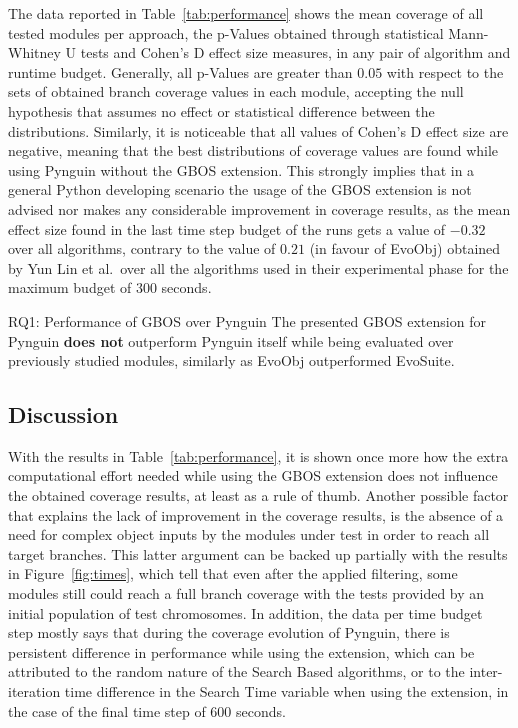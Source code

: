 \documentclass[%
  chapterprefix=false,%
  open=right,%
  twoside=true,%
  paper=a4,%
  logofile={Figures/logo.png},%
  thesistype=master,%
  UKenglish,%
]{se2thesis}
\begin{document}
The data reported in Table~\ref{tab:performance} shows the mean coverage of all tested modules per approach, the p-Values obtained through statistical Mann-Whitney U tests and Cohen's D effect size measures, in any pair of algorithm and runtime budget.
Generally, all p-Values are greater than \(0.05\) with respect to the sets of obtained branch coverage values in each module, accepting the null hypothesis that assumes no effect or statistical difference between the distributions.
Similarly, it is noticeable that all values of Cohen's D effect size are negative, meaning that the best distributions of coverage values are found while using Pynguin without the GBOS extension.
This strongly implies that in a general Python developing scenario the usage of the GBOS extension is not advised nor makes any considerable improvement in coverage results, as the mean effect size found in the last time step budget of the runs gets a value of \(-0.32\) over all algorithms, contrary to the value of \(0.21\) (in favour of EvoObj) obtained by Yun Lin et al.\ over all the algorithms used in their experimental phase for the maximum budget of 300 seconds. 

\begin{table}[bth]
  \centering
  
  \centering
  
  \centering
  
  \caption{Coverage Performance of Pynguin and GBOS with different time budgets.}\label{tab:performance}
\end{table}

\begin{summary}{RQ1: Performance of GBOS over Pynguin}
  The presented GBOS extension for Pynguin \textbf{does not} outperform Pynguin itself while being evaluated over previously studied modules, similarly as EvoObj outperformed EvoSuite. 
\end{summary}

\subsection*{Discussion}

With the results in Table~\ref{tab:performance}, it is shown once more how the extra computational effort needed while using the GBOS extension does not influence the obtained coverage results, at least as a rule of thumb.
Another possible factor that explains the lack of improvement in the coverage results, is the absence of a need for complex object inputs by the modules under test in order to reach all target branches.
This latter argument can be backed up partially with the results in Figure~\ref{fig:times}, which tell that even after the applied filtering, some modules still could reach a full branch coverage with the tests provided by an initial population of test chromosomes.
In addition, the data per time budget step mostly says that during the coverage evolution of Pynguin, there is persistent difference in performance while using the extension, which can be attributed to the random nature of the Search Based algorithms, or to the inter-iteration time difference in the Search Time variable when using the extension, in the case of the final time step of 600 seconds.
\end{document}
